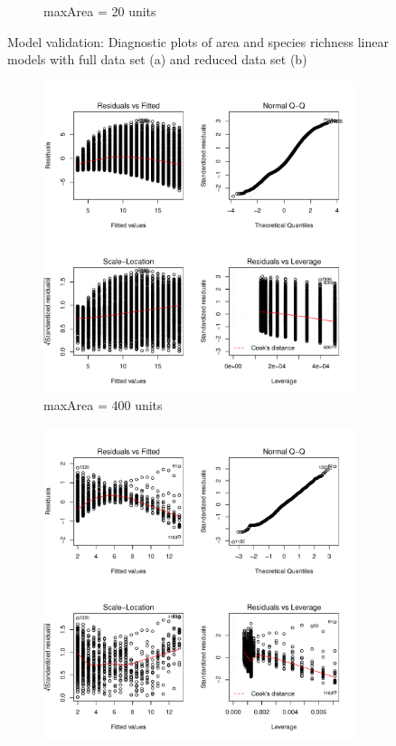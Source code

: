 \documentclass{article}
\begin{document}
\begin{figure}[h!]
\begin{subfigure}[b]{0.4\linewidth}
    \caption{maxArea = 20 units}
  \end{subfigure}
  \caption{Model validation: Diagnostic plots of area and species richness linear models with full data set (a) and reduced data set (b)}
  \label{fig:Model validation area/species LM}
\end{figure}\bigskip

\begin{figure}[h!]
  \centering
  \begin{subfigure}[b]{0.4\linewidth}
    \includegraphics[width=\linewidth]{../../Results/Simulation/NicheSpeciesLmPlot_1.pdf}
    \caption{maxArea = 400 units}
  \end{subfigure}
  \begin{subfigure}[b]{0.4\linewidth}
    \includegraphics[width=\linewidth]{../../Results/Simulation/NicheSpeciesLmPlot_20.pdf}

\end{subfigure}
\end{figure}
\end{document}
